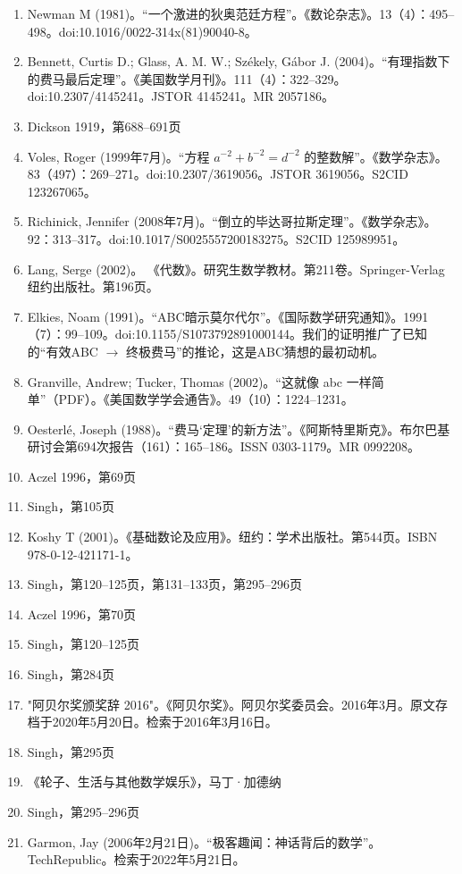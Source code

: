 \begin{enumerate}
\item Newman M (1981)。“一个激进的狄奥范廷方程”。《数论杂志》。13（4）：495–498。doi:10.1016/0022-314x(81)90040-8。  
\item Bennett, Curtis D.; Glass, A. M. W.; Székely, Gábor J. (2004)。“有理指数下的费马最后定理”。《美国数学月刊》。111（4）：322–329。doi:10.2307/4145241。JSTOR 4145241。MR 2057186。  
\item Dickson 1919，第688–691页  
\item Voles, Roger (1999年7月)。“方程 \( a^{-2} + b^{-2} = d^{-2} \) 的整数解”。《数学杂志》。83（497）：269–271。doi:10.2307/3619056。JSTOR 3619056。S2CID 123267065。  
\item Richinick, Jennifer (2008年7月)。“倒立的毕达哥拉斯定理”。《数学杂志》。92：313–317。doi:10.1017/S0025557200183275。S2CID 125989951。  
\item Lang, Serge (2002)。 《代数》。研究生数学教材。第211卷。Springer-Verlag纽约出版社。第196页。  
\item Elkies, Noam (1991)。“ABC暗示莫尔代尔”。《国际数学研究通知》。1991（7）：99–109。doi:10.1155/S1073792891000144。我们的证明推广了已知的“有效ABC \(\rightarrow\) 终极费马”的推论，这是ABC猜想的最初动机。
\item Granville, Andrew; Tucker, Thomas (2002)。“这就像 abc 一样简单”（PDF）。《美国数学学会通告》。49（10）：1224–1231。  
\item Oesterlé, Joseph (1988)。“费马‘定理’的新方法”。《阿斯特里斯克》。布尔巴基研讨会第694次报告（161）：165–186。ISSN 0303-1179。MR 0992208。  
\item Aczel 1996，第69页  
\item Singh，第105页  
\item Koshy T (2001)。《基础数论及应用》。纽约：学术出版社。第544页。ISBN 978-0-12-421171-1。  
\item Singh，第120–125页，第131–133页，第295–296页  
\item Aczel 1996，第70页  
\item Singh，第120–125页  
\item Singh，第284页  
\item "阿贝尔奖颁奖辞 2016"。《阿贝尔奖》。阿贝尔奖委员会。2016年3月。原文存档于2020年5月20日。检索于2016年3月16日。  
\item Singh，第295页  
\item 《轮子、生活与其他数学娱乐》，马丁·加德纳  
\item Singh，第295–296页  
\item Garmon, Jay (2006年2月21日)。“极客趣闻：神话背后的数学”。TechRepublic。检索于2022年5月21日。

\end{enumerate}
